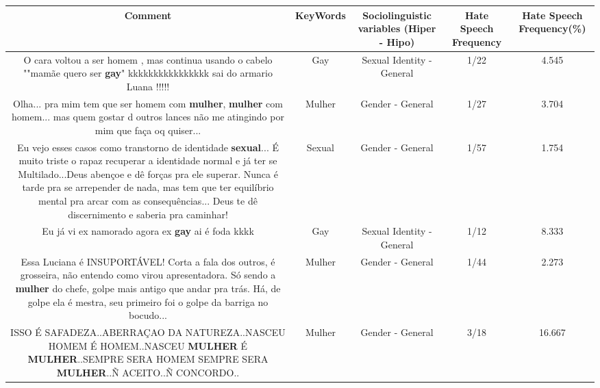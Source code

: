 \documentclass[11pt]{article}
\newlength\mylength
\begin{document}
\begin{center}
\setlength\mylength{\dimexpr\textwidth - 1\arrayrulewidth - 50\tabcolsep}
\begin{longtable}{|C{.65\mylength}|C{.30\mylength}|C{.12\mylength}|C{.12\mylength}|C{.12\mylength}|}
\hline
\textbf{Comment} & \textbf{KeyWords} & \textbf{Sociolinguistic variables (Hiper - Hipo)}  & \textbf{Hate Speech Frequency} & \textbf{Hate Speech Frequency(\%)} \\
\hline{}\small O cara voltou a ser homem , mas continua usando o cabelo ""mamãe quero ser \textbf{gay}"  kkkkkkkkkkkkkkkk sai do armario Luana !!!!!\normalsize   & Gay & Sexual Identity - General & 1/22 & 4.545 \\  \hline
  \small Olha... pra mim tem que ser homem com \textbf{mulher}, \textbf{mulher} com homem... mas quem gostar d outros lances não me atingindo por mim que faça oq quiser...\normalsize   & Mulher & Gender - General & 1/27 & 3.704 \\  \hline
  \small Eu vejo esses casos como transtorno de identidade \textbf{sexual}... É muito triste o rapaz recuperar a identidade normal e já ter se Multilado...Deus abençoe e dê forças pra ele superar. Nunca é tarde pra se arrepender de nada, mas tem que ter equilíbrio mental pra arcar com as consequências... Deus te dê discernimento e saberia pra caminhar!\normalsize   & Sexual & Gender - General & 1/57 & 1.754 \\  \hline
  \small Eu já vi ex namorado agora ex \textbf{gay} ai é foda kkkk\normalsize   & Gay & Sexual Identity - General & 1/12 & 8.333 \\  \hline
  \small Essa Luciana é INSUPORTÁVEL! Corta a fala dos outros, é grosseira, não entendo como virou apresentadora. Só sendo a \textbf{mulher} do chefe, golpe mais antigo que andar pra trás. Há, de golpe ela é mestra, seu primeiro foi o golpe da barriga no bocudo...\normalsize   & Mulher & Gender - General & 1/44 & 2.273 \\  \hline
  \small ISSO É SAFADEZA..ABERRAÇAO DA NATUREZA..NASCEU HOMEM É HOMEM..NASCEU \textbf{MULHER} É \textbf{MULHER}..SEMPRE SERA HOMEM SEMPRE SERA \textbf{MULHER}..Ñ ACEITO..Ñ CONCORDO..\normalsize   & Mulher & Gender - General & 3/18 & 16.667 \\  \hline

\end{longtable}
\end{center}
\end{document}

